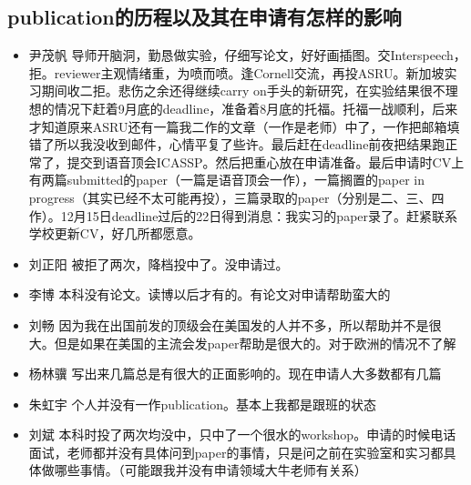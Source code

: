 \documentclass{vivid_layout}
\begin{document}
\subsection{publication的历程以及其在申请有怎样的影响}
\begin{itemize}
\item  { 尹茂帆} \quad 导师开脑洞，勤恳做实验，仔细写论文，好好画插图。交Interspeech，拒。reviewer主观情绪重，为喷而喷。逢Cornell交流，再投ASRU。新加坡实习期间收二拒。悲伤之余还得继续carry on手头的新研究，在实验结果很不理想的情况下赶着9月底的deadline，准备着8月底的托福。托福一战顺利，后来才知道原来ASRU还有一篇我二作的文章（一作是老师）中了，一作把邮箱填错了所以我没收到邮件，心情平复了些许。最后赶在deadline前夜把结果跑正常了，提交到语音顶会ICASSP。然后把重心放在申请准备。最后申请时CV上有两篇submitted的paper（一篇是语音顶会一作），一篇搁置的paper in progress（其实已经不太可能再投），三篇录取的paper（分别是二、三、四作）。12月15日deadline过后的22日得到消息：我实习的paper录了。赶紧联系学校更新CV，好几所都愿意。
\item  { 刘正阳}  \quad 被拒了两次，降档投中了。没申请过。
\item  { 李博}  \quad 本科没有论文。读博以后才有的。有论文对申请帮助蛮大的
\item  { 刘畅}  \quad 因为我在出国前发的顶级会在美国发的人并不多，所以帮助并不是很大。但是如果在美国的主流会发paper帮助是很大的。对于欧洲的情况不了解
\item  { 杨林骥}  \quad 写出来几篇总是有很大的正面影响的。现在申请人大多数都有几篇
\item  { 朱虹宇}  \quad 个人并没有一作publication。基本上我都是跟班的状态
\item  { 刘斌}  \quad 本科时投了两次均没中，只中了一个很水的workshop。申请的时候电话面试，老师都并没有具体问到paper的事情，只是问之前在实验室和实习都具体做哪些事情。（可能跟我并没有申请领域大牛老师有关系）
\end{itemize}
\end{document}
